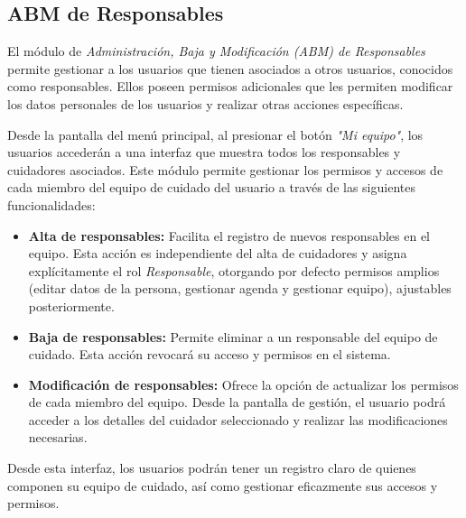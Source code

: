 \documentclass[a4paper,12pt]{article}
\begin{document}
    \subsection{ABM de Responsables}
    \par El módulo de \textit{Administración, Baja y Modificación (ABM) de Responsables} permite gestionar a los usuarios que tienen asociados a otros usuarios, conocidos como responsables. Ellos poseen permisos adicionales que les permiten modificar los datos personales de los usuarios y realizar otras acciones específicas.
    \par Desde la pantalla del menú principal, al presionar el botón \textit{"Mi equipo"}, los usuarios accederán a una interfaz que muestra todos los responsables y cuidadores asociados. Este módulo permite gestionar los permisos y accesos de cada miembro del equipo de cuidado del usuario a través de las siguientes funcionalidades:
    \begin{itemize}
        \item \textbf{Alta de responsables:} Facilita el registro de nuevos responsables en el equipo. Esta acción es independiente del alta de cuidadores y asigna explícitamente el rol \textit{Responsable}, otorgando por defecto permisos amplios (editar datos de la persona, gestionar agenda y gestionar equipo), ajustables posteriormente.
        \item \textbf{Baja de responsables:} Permite eliminar a un responsable del equipo de cuidado. Esta acción revocará su acceso y permisos en el sistema.
        \item \textbf{Modificación de responsables:} Ofrece la opción de actualizar los permisos de cada miembro del equipo. Desde la pantalla de gestión, el usuario podrá acceder a los detalles del cuidador seleccionado y realizar las modificaciones necesarias.
    \end{itemize}
    \par Desde esta interfaz, los usuarios podrán tener un registro claro de quienes componen su equipo de cuidado, así como gestionar eficazmente sus accesos y permisos.
\end{document}
